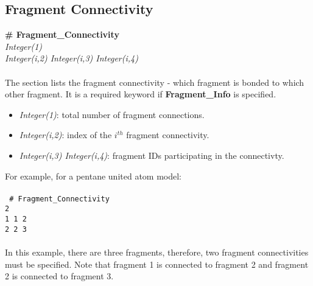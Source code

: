 \subsection{Fragment
  Connectivity}\label{sec:Get_Fragment_Connectivity}
%
{\bf \# Fragment\_Connectivity} \\
%
{\it Integer(1)} \\
%
{\it Integer(i,2) Integer(i,3) Integer(i,4)} \\ \\
%
The section lists the fragment connectivity - which fragment is bonded
to which other fragment. It is a required keyword if {\bf
  Fragment\_Info} is specified.
%
\begin{itemize}
\item {\it Integer(1)}: total number of fragment connections.
%
\item {\it Integer(i,2)}: index of the $i^{th}$ fragment connectivity.
%
\item {\it Integer(i,3) Integer(i,4)}: fragment IDs participating in the connectivty. 
\end{itemize}
%
For example, for a pentane united atom model: \\ \\
%
\texttt{
\# Fragment\_Connectivity\\
2\\
1    1    2\\
2    2    3\\
} \\
%
In this example, there are three fragments, therefore, two fragment connectivities must be specified. Note that fragment 1 is connected to fragment 2 and fragment 2 is connected to fragment 3.



